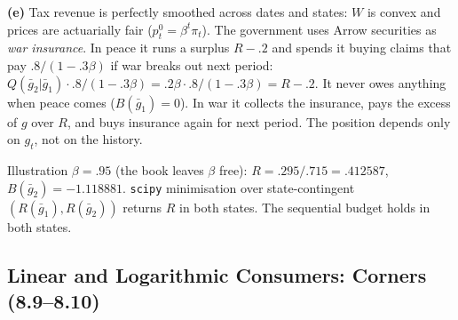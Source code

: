 \documentclass[12pt, letterpaper]{article}
\begin{document}
\begin{tcolorbox}[evenbox,title={Exercise 8.8 \quad Optimal taxation}]
\textbf{(e)} Tax revenue is perfectly smoothed across dates and states: $W$ is convex and prices are
actuarially fair ($p^0_t=\beta^t\pi_t$). The government uses Arrow securities as \emph{war insurance}. In peace it
runs a surplus $R-.2$ and spends it buying claims that pay $.8/(1-.3\beta)$ if war breaks out next period:
$Q(\bar g_2|\bar g_1)\cdot.8/(1-.3\beta)=.2\beta\cdot.8/(1-.3\beta)=R-.2$. It never owes anything when peace comes
($B(\bar g_1)=0$). In war it collects the insurance, pays the excess of $g$ over $R$, and buys insurance again
for next period. The position depends only on $g_t$, not on the history.

\begin{tcolorbox}[databox]
Illustration $\beta=.95$ (the book leaves $\beta$ free): $R=.295/.715=.412587$, $B(\bar g_2)=-1.118881$.
\texttt{scipy} minimisation over state-contingent $(R(\bar g_1),R(\bar g_2))$ returns $R$ in both states. The
sequential budget holds in both states.
\end{tcolorbox}
\end{tcolorbox}

\subsection{Linear and Logarithmic Consumers: Corners (8.9--8.10)}
\end{document}
